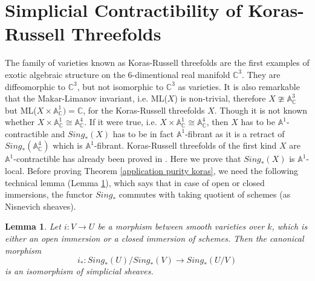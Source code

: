 \documentclass[11pt, reqno]{amsart}
\theoremstyle{plain}
\newtheorem{lemma}[thm]{Lemma}
\theoremstyle{definition}
\newcommand{\A}{{\mathbb A}}
\newcommand{\C}{{\mathbb C}}
\begin{document}
  \section{Simplicial Contractibility of Koras-Russell Threefolds}
  The family of varieties known as Koras-Russell threefolds are the first examples of exotic algebraic structure on the 6-dimentional real manifold $\C^3$. They are diffeomorphic to $\C^3$, but not isomorphic to $\C^3$ as varieties. It is also remarkable that the Makar-Limanov invariant, i.e. ML($X$) is non-trivial, therefore $X \ncong \A^3_\C$ but ML($X\times \A^1_\C)=\C$, for the Koras-Russell threefolds $X$. Though it is not known whether $X \times \A^1_\C \cong \A^4_\C$. If it were true, i.e. $X \times \A^1_\C \cong \A^4_\C$, then $X$ has to be $\A^1$-contractible and $Sing_*(X)$ has to be in fact $\A^1$-fibrant as it is a retract of $Sing_*(\A^4_\C)$ which is $\A^1$-fibrant. Koras-Russell threefolds of the first kind $X$ are $\A^1$-contractible has already been proved in \cite[Theorem 3.1]{df}. Here we prove that $Sing_*(X)$ is $\A^1$-local.
 Before proving Theorem \ref{application purity koras}, we need the following technical lemma (Lemma \ref{key lemma}), which says that in case of open or closed immersions, the functor $Sing_*$ commutes with taking quotient of schemes (as Nisnevich sheaves).
\begin{lemma} \label{key lemma}
    Let $i:V \to U$ be a morphism between smooth varieties over $k$, which is either an open immersion or a closed immersion of schemes. Then the canonical morphism
    $$i_*: Sing_*(U)/Sing_*(V) \to Sing_*(U/V)$$
    is an isomorphism of simplicial sheaves.
\end{lemma}
\end{document}
